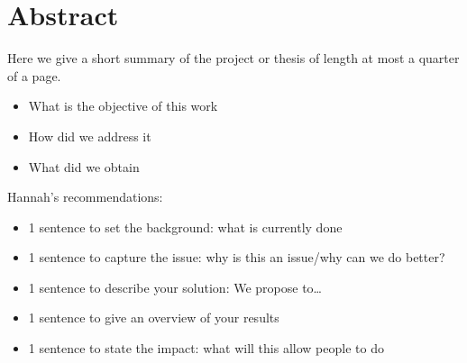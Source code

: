 
\section*{Abstract}
Here we give a short summary of the project or thesis of length at most a quarter of a page.

\begin{itemize}
  \item What is the objective of this work
  \item How did we address it
  \item What did we obtain
\end{itemize}

Hannah's recommendations:
\begin{itemize}
  \item 1 sentence to set the background: what is currently done
  \item 1 sentence to capture the issue: why is this an issue/why can we do better?
  \item 1 sentence to describe your solution: We propose to…
  \item 1 sentence to give an overview of your results
  \item 1 sentence to state the impact: what will this allow people to do
\end{itemize}



